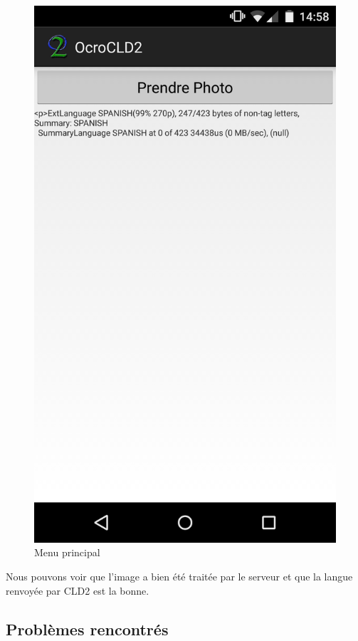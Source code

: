 	\begin{figure}[H]
		\centering
		\includegraphics[scale=0.2]{images/testRes.png}
		\caption{Menu principal}
		\label{fig:image}
	\end{figure}
Nous pouvons voir que l'image a bien été traitée par le serveur et que la langue renvoyée par CLD2 est la bonne.

\subsection{Problèmes rencontrés}

